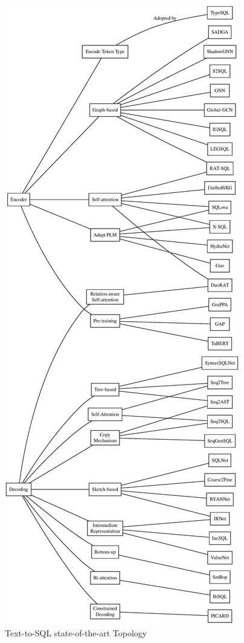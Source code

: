 
\begin{figure}
    \centering
    \includegraphics[height=1\textheight]{pics/mindmap/methods/map}
    \caption{Text-to-SQL state-of-the-art Topology}
    \label{fig:mindmap}
\end{figure}